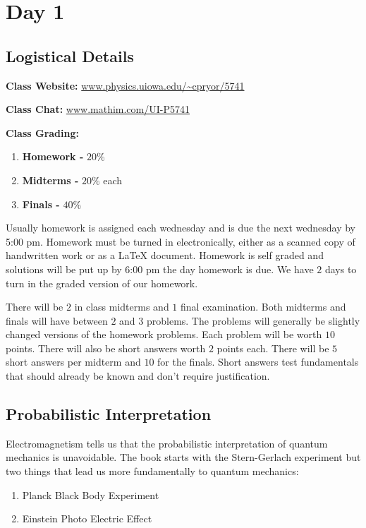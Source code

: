 \section{Day 1}

\subsection{Logistical Details}

\textbf{Class Website:} \url{www.physics.uiowa.edu/~cpryor/5741}

\noindent \textbf{Class Chat:} \url{www.mathim.com/UI-P5741}

\noindent \textbf{Class Grading:}

\begin{enumerate}
  \item \textbf{Homework -} $20\%$
  \item \textbf{Midterms -} $20\%$ each
  \item \textbf{Finals -} $40\%$
\end{enumerate}

Usually homework is assigned each wednesday and is due the next wednesday by 5:00 pm. Homework must be turned in electronically, either as a scanned copy of handwritten work or as a \LaTeX{} document. Homework is self graded and solutions will be put up by 6:00 pm the day homework is due. We have $2$ days to turn in the graded version of our homework.

There will be $2$ in class midterms and $1$ final examination. Both midterms and finals will have between $2$ and $3$ problems. The problems will generally be slightly changed versions of the homework problems. Each problem will be worth $10$ points. There will also be short answers worth $2$ points each. There will be $5$ short answers per midterm and $10$ for the finals. Short answers test fundamentals that should already be known and don't require justification.

\subsection{Probabilistic Interpretation}

Electromagnetism tells us that the probabilistic interpretation of quantum mechanics is unavoidable. The book starts with the Stern-Gerlach experiment but two things that lead us more fundamentally to quantum mechanics:

\begin{enumerate}
  \item Planck Black Body Experiment
  \item Einstein Photo Electric Effect
\end{enumerate}

